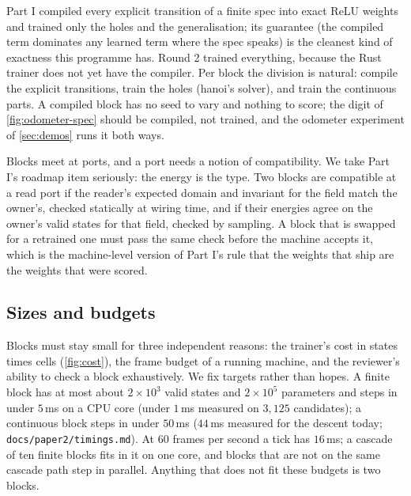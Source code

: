 Part I compiled every explicit transition of a finite spec into exact ReLU weights and trained only the holes
and the generalisation; its guarantee (the compiled term dominates any learned term where the spec speaks) is
the cleanest kind of exactness this programme has. Round 2 trained everything, because the Rust trainer does not
yet have the compiler. Per block the division is natural: compile the explicit transitions, train the holes
(hanoi's solver), and train the continuous parts. A compiled block has no seed to vary and nothing to score; the
digit of \cref{fig:odometer-spec} should be compiled, not trained, and the odometer experiment of
\cref{sec:demos} runs it both ways.

Blocks meet at ports, and a port needs a notion of compatibility. We take Part I's roadmap item seriously:
the energy is the type. Two blocks are compatible at a read port if the reader's expected domain and invariant
for the field match the owner's, checked statically at wiring time, and if their energies agree on the owner's
valid states for that field, checked by sampling. A block that is swapped for a retrained one must pass the
same check before the machine accepts it, which is the machine-level version of Part I's rule that the weights
that ship are the weights that were scored.

\subsection{Sizes and budgets}
\label{sec:budgets}

Blocks must stay small for three independent reasons: the trainer's cost in states times cells
(\cref{fig:cost}), the frame budget of a running machine, and the reviewer's ability to check a block
exhaustively. We fix targets rather than hopes. A finite block has at most about $2\times10^3$ valid states and
$2\times10^5$ parameters and steps in under $5$\,ms on a CPU core (under $1$\,ms measured on $3{,}125$
candidates); a continuous block steps in under $50$\,ms ($44$\,ms measured for the descent today;
\texttt{docs/paper2/timings.md}). At $60$ frames per second a tick has $16$\,ms; a cascade of ten finite
blocks fits in it on one core, and blocks that are not on the same cascade path step in parallel. Anything
that does not fit these budgets is two blocks.
